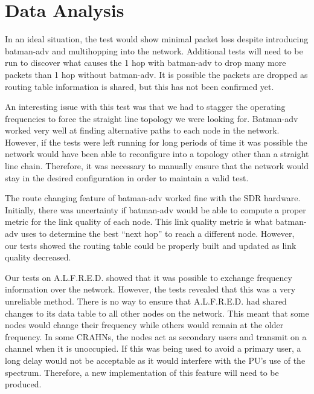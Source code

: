 
\section{Data Analysis}

In an ideal situation, the test would show minimal packet loss despite introducing batman-adv and multihopping into the network. Additional tests will need to be run to discover what causes the 1 hop with batman-adv to drop many more packets than 1 hop without batman-adv. It is possible the packets are dropped as routing table information is shared, but this has not been confirmed yet. 

An interesting issue with this test was that we had to stagger the operating frequencies to force the straight line topology we were looking for. Batman-adv worked very well at finding alternative paths to each node in the network. However, if the tests were left running for long periods of time it was possible the network would have been able to reconfigure into a topology other than a straight line chain. Therefore, it was necessary to manually ensure that the network would stay in the desired configuration in order to maintain a valid test. 

The route changing feature of batman-adv worked fine with the SDR hardware. Initially, there was uncertainty if batman-adv would be able to compute a proper metric for the link quality of each node. This link quality metric is what batman-adv uses to determine the best ``next hop'' to reach a different node. However, our tests showed the routing table could be properly built and updated as link quality decreased.

Our tests on A.L.F.R.E.D. showed that it was possible to exchange frequency information over the network. However, the tests revealed that this was a very unreliable method. There is no way to ensure that A.L.F.R.E.D. had shared changes to its data table to all other nodes on the network. This meant that some nodes would change their frequency while others would remain at the older frequency. In some CRAHNs, the nodes act as secondary users and transmit on a channel when it is unoccupied. If this was being used to avoid a primary user, a long delay would not be acceptable as it would interfere with the PU's use of the spectrum. Therefore, a new implementation of this feature will need to be produced. 



